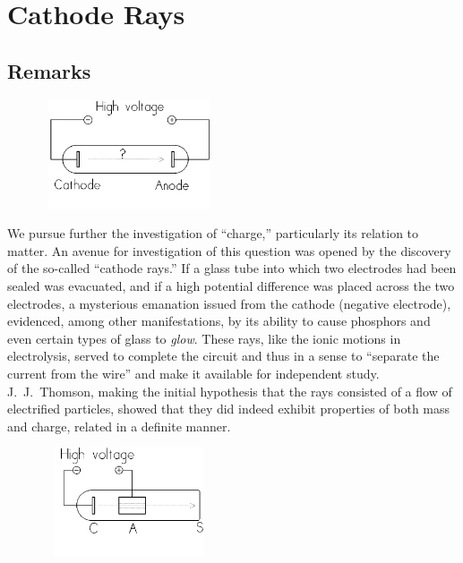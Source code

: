 \chapter{Cathode Rays}



\renewcommand{\theequation}{\arabic{equation}}

\section*{Remarks}

\begin{figure}
  \begin{center}
    \includegraphics[width=2in,height=1.26042in]{images/02_thomson/image001.png}
  \end{center}
\end{figure}

\indent

We pursue
further the investigation of ``charge,'' particularly its relation to
matter. An avenue for investigation of this question was opened by the
discovery of the so-called ``cathode rays.'' If a glass tube into which
two electrodes had been sealed was evacuated, and if a high potential
difference was placed across the two electrodes, a mysterious emanation
issued from the cathode (negative electrode), evidenced, among other
manifestations, by its ability to cause phosphors and even certain types
of glass to \emph{glow}. These rays, like the ionic motions in
electrolysis, served to complete the circuit and thus in a sense to
``separate the current from the wire'' and make it available for
independent study. J.\ J.\ Thomson, making the initial hypothesis that the
rays consisted of a flow of electrified particles, showed that they did
indeed exhibit properties of both mass and charge, related in a definite
manner.
\begin{figure}
  \begin{center}
    \includegraphics[width=2in,height=1.26042in]{images/02_thomson/image003.png}
  \end{center}
\end{figure}

